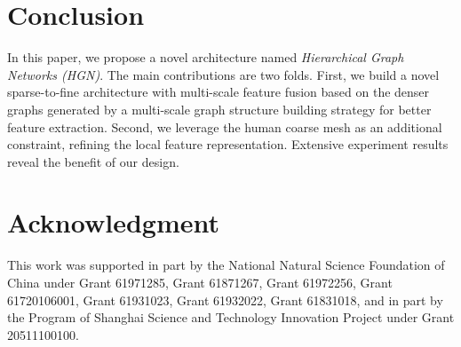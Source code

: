 \documentclass{bmvc2k}
\begin{document}
\section{Conclusion}
In this paper, we propose a novel architecture named \textit{Hierarchical Graph Networks (HGN)}. The main contributions are two folds. First, we build a novel sparse-to-fine architecture with multi-scale feature fusion based on the denser graphs generated by a multi-scale graph structure building strategy for better feature extraction. Second, we leverage the human coarse mesh as an additional constraint, refining the local feature representation. Extensive experiment results reveal the benefit of our design. 

\section*{Acknowledgment}
This work was supported in part by the National Natural Science Foundation of China under Grant 61971285, Grant 61871267, Grant 61972256, Grant 61720106001, Grant 61931023, Grant 61932022, Grant 61831018, and in part by the Program of Shanghai Science and Technology Innovation Project under Grant 20511100100.























































































\end{document}
